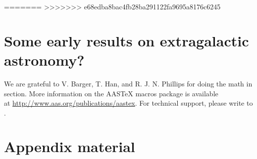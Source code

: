 \documentclass[12pt,preprint]{aastex}
\begin{document}
=======
>>>>>>> e68edba8bac4fb28ba291122fa9695a8176c6245
\section{Some early results on extragalactic astronomy?}

\acknowledgments

We are grateful to V. Barger, T. Han, and R. J. N. Phillips for
doing the math in section.
More information on the AASTeX macros package is available \\ at
\url{http://www.aas.org/publications/aastex}.
For technical support, please write to
.


\appendix

\section{Appendix material}




\clearpage
\end{document}
